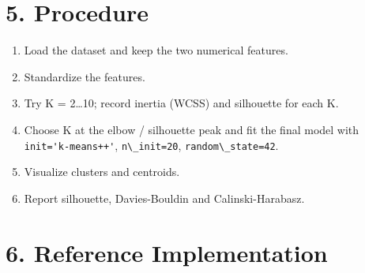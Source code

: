 \section{5. Procedure}\label{procedure}

\begin{enumerate}
\def\labelenumi{\arabic{enumi}.}
\tightlist
\item
  Load the dataset and keep the two numerical features.
\item
  Standardize the features.
\item
  Try K = 2\ldots10; record inertia (WCSS) and silhouette for each K.
\item
  Choose K at the elbow / silhouette peak and fit the final model with
  \passthrough{\lstinline!init='k-means++'!},
  \passthrough{\lstinline!n\_init=20!},
  \passthrough{\lstinline!random\_state=42!}.
\item
  Visualize clusters and centroids.
\item
  Report silhouette, Davies-Bouldin and Calinski-Harabasz.
\end{enumerate}

\section{6. Reference Implementation}\label{reference-implementation}


